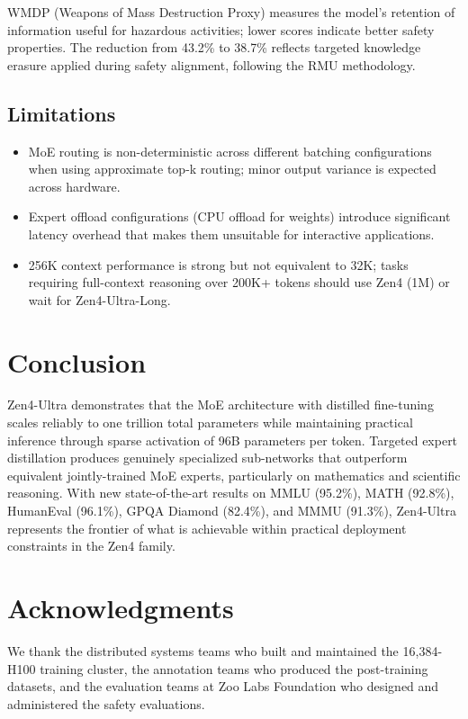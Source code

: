 \documentclass[11pt,a4paper]{article}
\begin{document}
WMDP (Weapons of Mass Destruction Proxy) measures the model's retention of information
useful for hazardous activities; lower scores indicate better safety properties. The
reduction from 43.2\% to 38.7\% reflects targeted knowledge erasure applied during
safety alignment, following the RMU methodology.

\subsection{Limitations}

\begin{itemize}
    \item MoE routing is non-deterministic across different batching configurations
    when using approximate top-k routing; minor output variance is expected across hardware.
    \item Expert offload configurations (CPU offload for weights) introduce significant
    latency overhead that makes them unsuitable for interactive applications.
    \item 256K context performance is strong but not equivalent to 32K; tasks requiring
    full-context reasoning over 200K+ tokens should use Zen4 (1M) or wait for Zen4-Ultra-Long.
\end{itemize}

\section{Conclusion}

Zen4-Ultra demonstrates that the MoE architecture with distilled fine-tuning scales reliably to one trillion total
parameters while maintaining practical inference through sparse activation of 96B parameters
per token. Targeted expert distillation produces genuinely specialized sub-networks that
outperform equivalent jointly-trained MoE experts, particularly on mathematics and scientific
reasoning. With new state-of-the-art results on MMLU (95.2\%), MATH (92.8\%), HumanEval
(96.1\%), GPQA Diamond (82.4\%), and MMMU (91.3\%), Zen4-Ultra represents the frontier
of what is achievable within practical deployment constraints in the Zen4 family.

\section*{Acknowledgments}

We thank the distributed systems teams who built and maintained the 16,384-H100 training
cluster, the annotation teams who produced the post-training datasets, and the evaluation
teams at Zoo Labs Foundation who designed and administered the safety evaluations.
\end{document}
